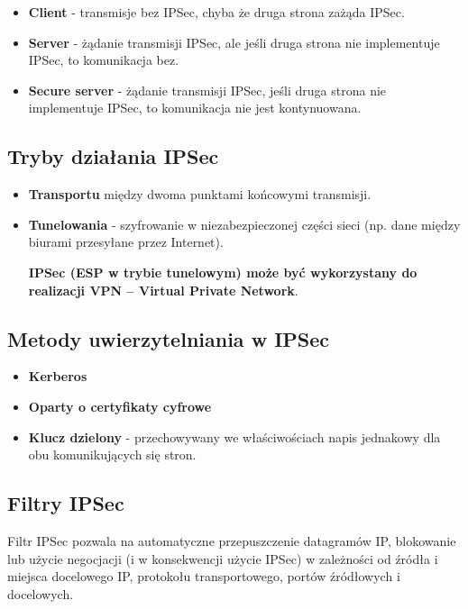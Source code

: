 \documentclass[../sk-egzamin.tex]{subfiles}
\begin{document}
\begin{itemize}
    \item \textbf{Client}  - transmisje bez IPSec,
    chyba że druga strona zażąda IPSec.
    \item \textbf{Server}  - żądanie transmisji IPSec,
    ale jeśli druga strona nie implementuje IPSec, to komunikacja bez.
    \item \textbf{Secure server}  - żądanie transmisji
    IPSec, jeśli druga strona nie implementuje IPSec, to komunikacja nie jest
    kontynuowana.
\end{itemize}


\subsection*{Tryby działania IPSec }
\begin{itemize}
    \item \textbf{Transportu} 
    między dwoma punktami końcowymi transmisji.
    \item \textbf{Tunelowania} -
    szyfrowanie w niezabezpieczonej części sieci (np. dane między
    biurami przesyłane przez Internet).

    \textbf{IPSec (ESP w trybie tunelowym) może być wykorzystany do realizacji
    VPN – Virtual Private Network}.
\end{itemize}

\subsection*{Metody uwierzytelniania w IPSec}
\begin{itemize}
    \item \textbf{Kerberos}
    \item \textbf{Oparty o certyfikaty cyfrowe}
    \item \textbf{Klucz dzielony} - przechowywany we właściwościach napis
    jednakowy dla obu komunikujących się stron.
\end{itemize}

\subsection*{Filtry IPSec}

Filtr IPSec pozwala na automatyczne przepuszczenie datagramów IP, blokowanie
lub użycie negocjacji (i w konsekwencji użycie IPSec) w zależności od źródła i
miejsca docelowego IP, protokołu transportowego, portów źródłowych i docelowych.

\pagebreak
\end{document}
